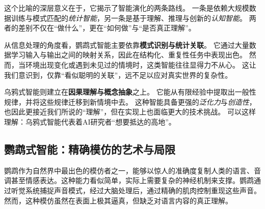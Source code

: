 
这个比喻的深层意义在于，它揭示了智能演化的两条路线。
一条是依赖大规模数据训练与模式匹配的\emph{统计智能}，另一条是基于理解、推理与创新的\emph{认知智能}。
两者的差别不仅在“做什么”，更在“如何做”与“是否真正理解”。


从信息处理的角度看，鹦鹉式智能主要依靠\textbf{模式识别与统计关联}。
它通过大量数据学习输入与输出之间的映射关系，因此在结构化、重复性任务中表现出色。
然而，当环境出现变化或遇到未见过的情境时，这类智能往往显得力不从心。
这让我们意识到，仅靠“看似聪明的关联”，远不足以应对真实世界的复杂性。


乌鸦式智能则建立在\textbf{因果理解与概念抽象}之上。
它能从有限经验中提取出一般性规律，并将这些规律迁移到新情境中去。
这种智能具备更强的\emph{泛化力}与\emph{创造性}，也因此更接近我们所说的“理解”，但在实现上也面临更大的技术挑战。
可以这样理解：乌鸦式智能代表着AI研究者“想要抵达的高地”。

\subsection{鹦鹉式智能：精确模仿的艺术与局限}

鹦鹉作为自然界中最出色的模仿者之一，能够以惊人的准确度复制人类的语言、音调甚至情感表达。这种能力看似简单，实际上需要复杂的神经机制来支撑。鹦鹉通过听觉系统捕捉声音模式，经过大脑处理后，通过精确的肌肉控制重现这些声音。然而，这种模仿虽然在表面上极其逼真，但缺乏对语言内容的真正理解。

